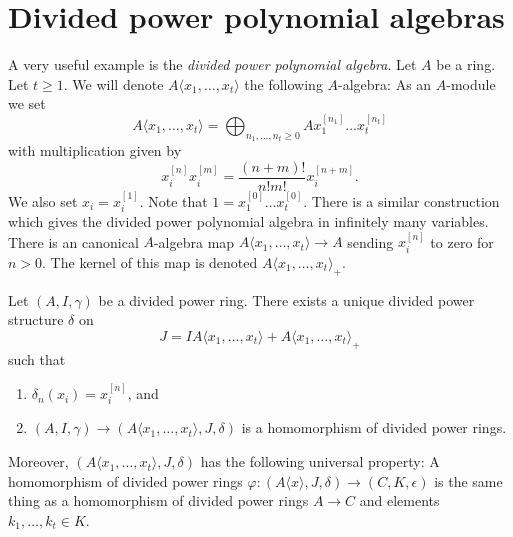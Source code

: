 \section{Divided power polynomial algebras}
\label{section-divided-power-polynomial-ring}

\noindent
A very useful example is the {\it divided power polynomial algebra}.
Let $A$ be a ring. Let $t \geq 1$. We will denote
$A\langle x_1, \ldots, x_t \rangle$ the following $A$-algebra:
As an $A$-module we set
$$
A\langle x_1, \ldots, x_t \rangle =
\bigoplus\nolimits_{n_1, \ldots, n_t \geq 0} A x_1^{[n_1]} \ldots x_t^{[n_t]}
$$
with multiplication given by
$$
x_i^{[n]}x_i^{[m]} = \frac{(n + m)!}{n!m!}x_i^{[n + m]}.
$$
We also set $x_i = x_i^{[1]}$. Note that
$1 = x_1^{[0]} \ldots x_t^{[0]}$. There is a similar construction
which gives the divided power polynomial algebra in infinitely many
variables. There is an canonical $A$-algebra map
$A\langle x_1, \ldots, x_t \rangle \to A$ sending $x_i^{[n]}$ to zero
for $n > 0$. The kernel of this map is denoted
$A\langle x_1, \ldots, x_t \rangle_{+}$.

\begin{lemma}
\label{lemma-divided-power-polynomial-algebra}
Let $(A, I, \gamma)$ be a divided power ring.
There exists a unique divided power structure $\delta$ on
$$
J = IA\langle x_1, \ldots, x_t \rangle + A\langle x_1, \ldots, x_t \rangle_{+}
$$
such that
\begin{enumerate}
\item $\delta_n(x_i) = x_i^{[n]}$, and
\item $(A, I, \gamma) \to (A\langle x_1, \ldots, x_t \rangle, J, \delta)$
is a homomorphism of divided power rings.
\end{enumerate}
Moreover, $(A\langle x_1, \ldots, x_t \rangle, J, \delta)$ has the
following universal property: A homomorphism of divided power rings
$\varphi : (A\langle x \rangle, J, \delta) \to (C, K, \epsilon)$ is
the same thing as a homomorphism of divided power rings
$A \to C$ and elements $k_1, \ldots, k_t \in K$.
\end{lemma}

